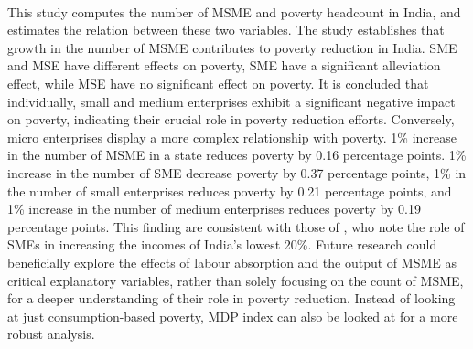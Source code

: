 \documentclass [12pt]{article}
\begin{document}
\paragraph{} This study computes the number of MSME and poverty headcount in India, and estimates the relation between these two variables. The study establishes that growth in the number of MSME contributes to poverty reduction in India. SME and MSE have different effects on poverty, SME have a significant alleviation effect, while MSE have no significant effect on poverty. It is concluded that individually, small and medium enterprises exhibit a significant negative impact on poverty, indicating their crucial role in poverty reduction efforts. Conversely, micro enterprises display a more complex relationship with poverty.
1\% increase in the number of MSME in a state reduces poverty by 0.16 percentage points. 1\% increase in the number of SME decrease poverty by 0.37 percentage points, 1\% in the number of small enterprises reduces poverty by 0.21 percentage points, and 1\% increase in the number of medium enterprises reduces poverty by 0.19 percentage points. This finding are consistent with those of \textcite{manzoor2019role}, who note the role of SMEs in increasing the incomes of India's lowest 20\%. Future research could beneficially explore the effects of labour absorption and the output of MSME as critical explanatory variables, rather than solely focusing on the count of MSME, for a deeper understanding of their role in poverty reduction. Instead of looking at just consumption-based poverty, MDP index can also be looked at for a more robust analysis.

\end{document}
